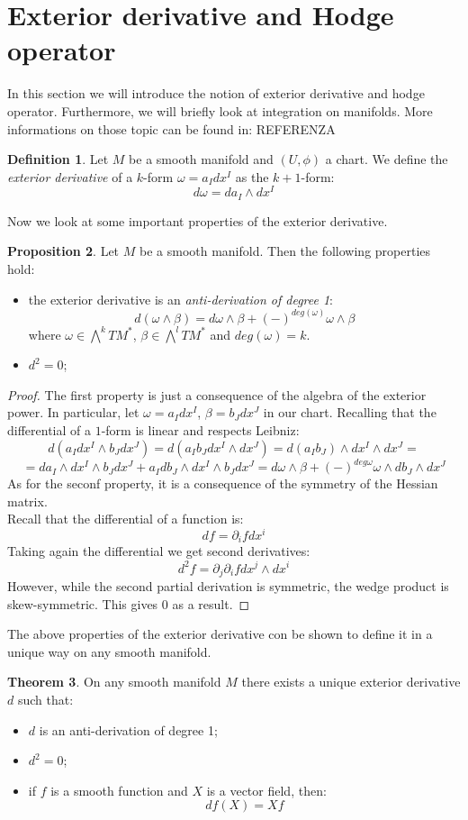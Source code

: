 \documentclass[12pt,a4paper]{report}
\theoremstyle{definition}
\newtheorem{Def}{Definition}[chapter]
\theoremstyle{Theorem}
\newtheorem{Theo}[Def]{Theorem}
\newtheorem{Prop}[Def]{Proposition}
\theoremstyle{definition}
\theoremstyle{definition}
\begin{document}
	\section{Exterior derivative and Hodge operator}
	In this section we will introduce the notion of exterior derivative and hodge operator. Furthermore, we will briefly look at integration on manifolds. More informations on those topic can be found in:
	REFERENZA
	\begin{Def}
		Let $M$ be a smooth manifold and $(U,\phi)$ a chart. We define the \textit{exterior derivative} of a $k$-form $\omega=a_Idx^I$ as the $k+1$-form:
		$$d\omega=da_I\wedge dx^I$$
	\end{Def}
	Now we look at some important properties of the exterior derivative.
	\begin{Prop}
		Let $M$ be a smooth manifold. Then the following properties hold:
		\begin{itemize}
			\item the exterior derivative is an \textit{anti-derivation of degree 1}: $$d(\omega\wedge\beta)=d\omega\wedge\beta+(-)^{deg(\omega)}\omega\wedge\beta$$
			where $\omega\in \bigwedge^k TM^*$, $\beta\in \bigwedge^l TM^*$ and $deg(\omega)=k$.
			\item $d^2=0$;
		\end{itemize}
	\end{Prop}
	\begin{proof}
		The first property is just a consequence of the algebra of the exterior power. In particular, let $\omega=a_Idx^I$, $\beta=b_Jdx^J$ in our chart. Recalling that the differential of a $1$-form is linear and respects Leibniz:
		$$d(a_Idx^I\wedge b_Jdx^J)=d(a_Ib_Jdx^I\wedge dx^J)=d(a_Ib_J)\wedge dx^I\wedge dx^J=$$
		$$=da_I\wedge dx^I\wedge b_Jdx^J+a_Idb_J\wedge dx^I\wedge b_Jdx^J=d\omega\wedge\beta+(-)^{deg\omega}\omega\wedge db_J\wedge dx^J$$
		As for the seconf property, it is a consequence of the symmetry of the Hessian matrix.\\
		Recall that the differential of a function is:
		$$df=\partial_ifdx^i$$
		Taking again the differential we get second derivatives:
		$$d^2f=\partial_j\partial_i f dx^j\wedge dx^i$$
		However, while the second partial derivation is symmetric, the wedge product is skew-symmetric. This gives 0 as a result.
	\end{proof}
	The above properties of the exterior derivative con be shown to define it in a unique way on any smooth manifold.
	\begin{Theo}
		On any smooth manifold $M$ there exists a unique exterior derivative $d$ such that:
		\begin{itemize}
			\item $d$ is an anti-derivation of degree 1;
			\item $d^2=0$;
			\item if $f$ is a smooth function and $X$ is a vector field, then:
			$$df(X)=Xf$$
		\end{itemize}
	\end{Theo}
\end{document}
